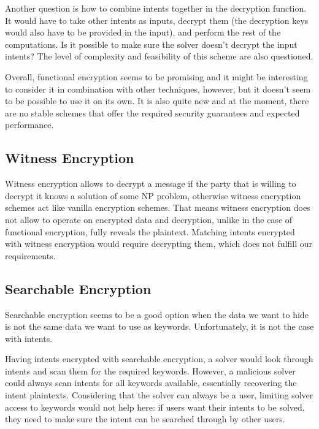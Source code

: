 \documentclass[
    9pt,            %
    report,        %
    affiltop,       %
]{art}
\begin{document}
\hfill

Another question is how to combine intents together in the decryption function. It would have to take other intents as inputs, decrypt them (the decryption keys would also have to be provided in the input), and perform the rest of the computations. Is it possible to make sure the solver doesn't decrypt the input intents? The level of complexity and feasibility of this scheme are also questioned.

\hfill

Overall, functional encryption seems to be promising and it might be interesting to consider it in combination with other techniques, however, but it doesn't seem to be possible to use it on its own. It is also quite new and at the moment, there are no stable schemes that offer the required security guarantees and expected performance.


\subsection{Witness Encryption}

Witness encryption allows to decrypt a message if the party that is willing to decrypt it knows a solution of some NP problem, otherwise witness encryption schemes act like vanilla encryption schemes. That means witness encryption does not allow to operate on encrypted data and decryption, unlike in the case of functional encryption, fully reveals the plaintext. Matching intents encrypted with witness encryption would require decrypting them, which does not fulfill our requirements.

\subsection{Searchable Encryption}

Searchable encryption seems to be a good option when the data we want to hide is not the same data we want to use as keywords. Unfortunately, it is not the case with intents.

Having intents encrypted with searchable encryption, a solver would look through intents and scan them for the required keywords. However, a malicious solver could always scan intents for all keywords available, essentially recovering the intent plaintexts. Considering that the solver can always be a user, limiting solver access to keywords would not help here: if users want their intents to be solved, they need to make sure the intent can be searched through by other users. 
\end{document}
